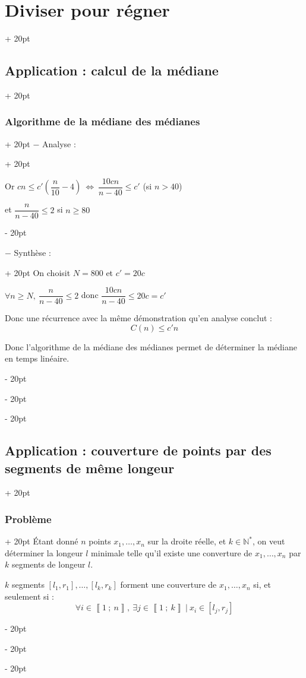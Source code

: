 \documentclass[a4paper, 12pt, twoside]{article}
\newcommand{\N}{\mathbb{N}} %
\newcommand{\nset}[2]{\left\llbracket #1\ ;\ #2 \right\rrbracket}
\newcommand{\lr}[1]{\left( #1 \right)}
\newcommand{\ssi}{\ \Leftrightarrow \ }
\renewcommand{\le}{\leqslant}
\renewcommand{\ge}{\geqslant}
\newcommand{\ind}[1][20pt]{\advance\leftskip + #1}
\newcommand{\deind}[1][20pt]{\advance\leftskip - #1}
\newenvironment{indt}[2][20pt]{#2 \par \ind[#1]}{\par \deind} %
\begin{document}
\begin{indt}{\section{Diviser pour régner}}
\begin{indt}{\subsection{Application : calcul de la médiane}}
\begin{indt}{\subsubsection{Algorithme de la médiane des médianes}}
\begin{indt}{$-$ Analyse :}
                    \vspace{12pt}
                    
                    Or $cn \le c'\lr{\dfrac n {10} - 4} \ssi \dfrac{10cn}{n - 40} \le c'$ (si $n > 40$)
                    
                    et $\dfrac{n}{n - 40} \le 2$ si $n \ge 80$
                \end{indt}
                    
                \vspace{24pt}
                
                \begin{indt}{$-$ Synthèse :}
                    On choisit $N = 800$ et $c' = 20c$
                    
                    $\forall n \ge N,\ \dfrac{n}{n - 40} \le 2$ donc $\dfrac{10cn}{n - 40} \le 20c = c'$
                    
                    Donc une récurrence avec la même démonstration qu'en analyse conclut :
                        \[ C(n) \le c'n \]
                    
                    Donc l'algorithme de la médiane des médianes permet de déterminer la médiane en temps linéaire.
                \end{indt}
            \end{indt}
        \end{indt}
        
        \vspace{12pt}
        
        \begin{indt}{\subsection{Application : couverture de points par des segments de même longeur}}
            \begin{indt}{\subsubsection{Problème}}
                \'Etant donné $n$ points $x_1, \ldots, x_n$ sur la droite réelle, et $k \in \N^*$, on veut déterminer la longeur $l$ minimale telle qu'il existe une converture de $x_1, \ldots, x_n$ par $k$ segments de longeur $l$.
                
                $k$ segments $[l_1, r_1], \ldots, [l_k, r_k]$ forment une couverture de $x_1, \ldots, x_n$ si, et seulement si :
                    \[ \forall i \in \nset 1 n,\ \exists j \in \nset 1 k\ |\ x_i \in [l_j, r_j] \]
            \end{indt}
            

\end{indt}
\end{indt}
\end{document}
